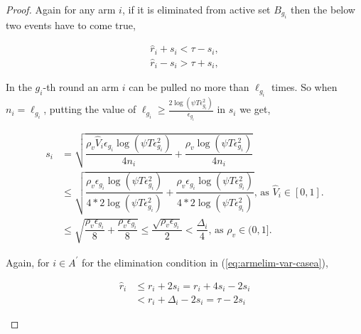 \begin{proof}
Again for any arm $i$, if it is eliminated from active set $B_{g_{i}}$ then the below two events have to come true,
\begin{small}
\begin{align}
\hat{r}_{i} + s_{i} < \tau - s_{i}, \label{eq:armelim-var-casea}\\
\hat{r}_{i} - s_{i} > \tau + s_{i}, \label{eq:armelim-var-caseb}
\end{align}
\end{small}
%
In the $g_{i}$-th round an arm $i$ can be pulled no more than $\ell_{g_{i}}$ times. So when $n_{i}=\ell_{g_{i}}$, putting the value of $\ell_{g_{i}}\ge\frac{2\log{(\psi T\epsilon_{g_{i}}^{2})}}{\epsilon_{g_{i}}}$ in $s_{i}$ we get, 
\begin{small}
\begin{align*}
s_{i}&=\sqrt{\dfrac{\rho_v \hat{V}_{i} \epsilon_{g_{i}}\log (\psi T\epsilon_{g_{i}}^{2})}{4 n_{i}} + \dfrac{\rho_v \log{(\psi T\epsilon_{g_{i}}^{2})}}{4 n_{i}}} \\
&\leq \sqrt{\dfrac{\rho_v \epsilon_{g_{i}}\log (\psi T\epsilon_{g_{i}}^{2})}{4*2 \log(\psi T\epsilon_{g_{i}}^{2})} + \dfrac{\rho_v \epsilon_{g_{i}} \log{(\psi T\epsilon_{g_{i}}^{2})}}{4*2 \log(\psi T\epsilon_{g_{i}}^{2})} } \text{, as }\hat{V}_{i}\in [0,1].\\
& \leq \sqrt{\dfrac{\rho_v \epsilon_{g_{i}}}{8} + \dfrac{\rho_v \epsilon_{g_{i}}}{8} } \leq \dfrac{\sqrt{\rho_v \epsilon_{g_{i}}}}{2}< \dfrac{\Delta_{i}}{4} \text{, as }\rho_v\in (0,1].
\end{align*}
\end{small}

Again, for ${i} \in A^{'}$ for the elimination condition in (\ref{eq:armelim-var-casea}),
\begin{small}
\begin{align*}
\hat{r}_{i} &\leq r_{i} + 2s_{i} = r_{i} + 4s_{i} - 2s_{i} \\
&< r_{i} + \Delta_{i} - 2s_{i} = \tau -2s_{i} %
\end{align*}
\end{small} 



\end{proof}
